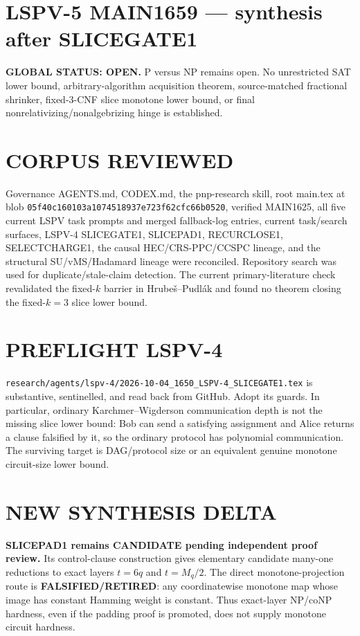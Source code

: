 \documentclass[11pt]{article}
\begin{document}
\section*{LSPV-5 MAIN1659 --- synthesis after SLICEGATE1}
\textbf{GLOBAL STATUS: OPEN.} P versus NP remains open. No unrestricted SAT lower bound, arbitrary-algorithm acquisition theorem, source-matched fractional shrinker, fixed-3-CNF slice monotone lower bound, or final nonrelativizing/nonalgebrizing hinge is established.

\section*{CORPUS REVIEWED}
Governance AGENTS.md, CODEX.md, the pnp-research skill, root main.tex at blob \texttt{05f40c160103a1074518937e723f62cfc66b0520}, verified MAIN1625, all five current LSPV task prompts and merged fallback-log entries, current task/search surfaces, LSPV-4 SLICEGATE1, SLICEPAD1, RECURCLOSE1, SELECTCHARGE1, the causal HEC/CRS-PPC/CCSPC lineage, and the structural SU/vMS/Hadamard lineage were reconciled. Repository search was used for duplicate/stale-claim detection. The current primary-literature check revalidated the fixed-$k$ barrier in Hrube\v{s}--Pudl\'ak and found no theorem closing the fixed-$k=3$ slice lower bound.

\section*{PREFLIGHT LSPV-4}
\texttt{research/agents/lspv-4/2026-10-04\_1650\_LSPV-4\_SLICEGATE1.tex} is substantive, sentinelled, and read back from GitHub. Adopt its guards. In particular, ordinary Karchmer--Wigderson communication depth is not the missing slice lower bound: Bob can send a satisfying assignment and Alice returns a clause falsified by it, so the ordinary protocol has polynomial communication. The surviving target is DAG/protocol size or an equivalent genuine monotone circuit-size lower bound.

\section*{NEW SYNTHESIS DELTA}
\textbf{SLICEPAD1 remains CANDIDATE pending independent proof review.} Its control-clause construction gives elementary candidate many-one reductions to exact layers $t=6q$ and $t=M_q/2$. The direct monotone-projection route is \textbf{FALSIFIED/RETIRED}: any coordinatewise monotone map whose image has constant Hamming weight is constant. Thus exact-layer NP/coNP hardness, even if the padding proof is promoted, does not supply monotone circuit hardness.
\end{document}
